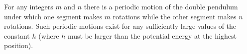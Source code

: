For any integers $m$ and $n$ there is a periodic motion of the double pendulum under which one segment makes $m$ rotations while the other segment makes $n$ rotations. Such periodic motions exist for any sufficiently large values of the constant $h$ (where $h$ must be larger than the potential energy at the highest position).
